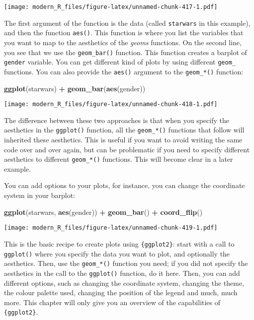 \documentclass[
]{article}
\newenvironment{Shaded}{\begin{snugshade}}{\end{snugshade}}
\newcommand{\KeywordTok}[1]{\textcolor[rgb]{0.13,0.29,0.53}{\textbf{#1}}}
\newcommand{\NormalTok}[1]{#1}
\newcommand{\OperatorTok}[1]{\textcolor[rgb]{0.81,0.36,0.00}{\textbf{#1}}}
\newcommand{\StringTok}[1]{\textcolor[rgb]{0.31,0.60,0.02}{#1}}
\begin{document}
\texttt{[image: modern\_R\_files/figure-latex/unnamed-chunk-417-1.pdf]}

The first argument of the function is the data (called \texttt{starwars} in this example), and then the
function \texttt{aes()}. This function is where you list the variables that you want to map to the aesthetics
of the \emph{geoms} functions. On the second line, you see that we use the \texttt{geom\_bar()} function. This
function creates a barplot of \texttt{gender} variable.
You can get different kind of plots by using different \texttt{geom\_} functions. You can also provide the
\texttt{aes()} argument to the \texttt{geom\_*()} function:

\begin{Shaded}
\begin{Highlighting}[]
\KeywordTok{ggplot}\NormalTok{(starwars) }\OperatorTok{+}
\StringTok{  }\KeywordTok{geom\_bar}\NormalTok{(}\KeywordTok{aes}\NormalTok{(gender))}
\end{Highlighting}
\end{Shaded}

\texttt{[image: modern\_R\_files/figure-latex/unnamed-chunk-418-1.pdf]}

The difference between these two approaches is that when you specify the aesthetics in the \texttt{ggplot()} function,
all the \texttt{geom\_*()} functions that follow will inherited these aesthetics. This is useful if you want to avoid
writing the same code over and over again, but can be problematic if you need to specify different aesthetics
to different \texttt{geom\_*()} functions. This will become clear in a later example.

You can add options to your plots, for instance, you can change the coordinate system in your barplot:

\begin{Shaded}
\begin{Highlighting}[]
\KeywordTok{ggplot}\NormalTok{(starwars, }\KeywordTok{aes}\NormalTok{(gender)) }\OperatorTok{+}
\StringTok{  }\KeywordTok{geom\_bar}\NormalTok{() }\OperatorTok{+}
\StringTok{  }\KeywordTok{coord\_flip}\NormalTok{()}
\end{Highlighting}
\end{Shaded}

\texttt{[image: modern\_R\_files/figure-latex/unnamed-chunk-419-1.pdf]}

This is the basic recipe to create plots using \texttt{\{ggplot2\}}: start with a call to \texttt{ggplot()} where you specify
the data you want to plot, and optionally the aesthetics. Then, use the \texttt{geom\_*()} function you need; if you
did not specify the aesthetics in the call to the \texttt{ggplot()} function, do it here. Then, you can add different
options, such as changing the coordinate system, changing the theme, the colour palette used, changing the
position of the legend and much, much more. This chapter will only give you an overview of the capabilities
of \texttt{\{ggplot2\}}.
\end{document}
